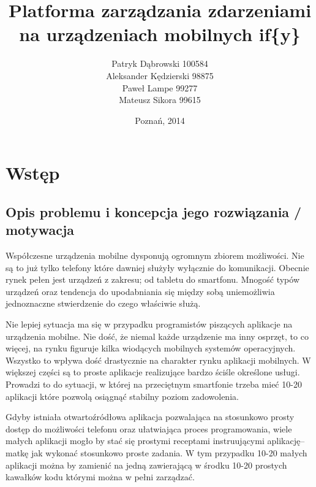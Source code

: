 \documentclass[11pt,a4paper,polish,thesis]{dcsbook}
\begin{document}
\author{Patryk Dąbrowski 100584\\ Aleksander Kędzierski 98875\\ Paweł Lampe 99277\\ Mateusz Sikora 99615}
\title{Platforma zarządzania zdarzeniami na urządzeniach mobilnych if\{y\}}
\date{Poznań, 2014}

\maketitle

\frontmatter

\tableofcontents{}

\mainmatter

\chapter{Wstęp}
\section{Opis problemu i koncepcja jego rozwiązania / motywacja}
Współczesne urządzenia mobilne dysponują ogromnym zbiorem możliwości. Nie są to już tylko telefony które dawniej służyły wyłącznie do komunikacji. Obecnie rynek pełen
jest urządzeń z zakresu; od tabletu do smartfonu. Mnogość typów urządzeń oraz tendencja do upodabniania się między sobą uniemożliwia jednoznaczne stwierdzenie do
czego właściwie służą.

Nie lepiej sytuacja ma się w przypadku programistów piszących aplikacje na urządzenia mobilne. Nie dość, że niemal każde urządzenie ma inny osprzęt, to co więcej, na
rynku figuruje kilka wiodących mobilnych systemów operacyjnych. Wszystko to wpływa dość drastycznie na charakter rynku aplikacji mobilnych. W większej części są to
proste aplikacje realizujące bardzo ściśle określone usługi. Prowadzi to do sytuacji, w której na przeciętnym smartfonie trzeba mieć 10-20 aplikacji które pozwolą osiągnąć stabilny poziom zadowolenia.

Gdyby istniała otwartoźródłowa aplikacja pozwalająca na stosunkowo prosty dostęp do możliwości telefonu oraz ułatwiająca proces programowania, wiele małych aplikacji
mogło by stać się prostymi receptami instruującymi aplikację--matkę jak wykonać stosunkowo proste zadania. W tym przypadku 10-20 małych aplikacji można by zamienić
na jedną zawierającą w środku 10-20 prostych kawałków kodu którymi można w pełni zarządzać.
\end{document}
